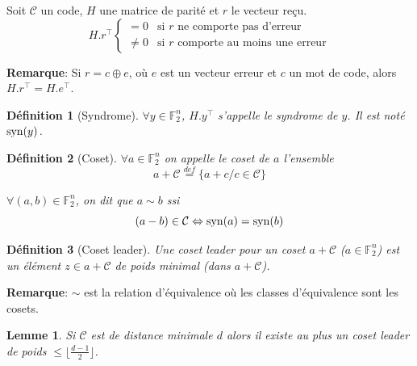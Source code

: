 \documentclass[a4paper,10pt,twocolumn]{article}
\theoremstyle{break}
\newcommand{\code}[1]{\mathcal{#1}}
\newcommand{\C}{\code{C}}
\newcommand{\syn}[1]{\mathop{\rm{syn}}(#1)}
\newcommand{\F}{\mathbb{F}}
\newcommand{\FF}{\F_2}
\newcommand{\FFn}[1]{\FF^{#1}}
\newtheorem{mydef}{Définition}
\newtheorem{mylemma}{Lemme}
\newenvironment{note}[1]
{\textbf{#1}:}
{}
\newenvironment{remarque}
{\begin{note}{Remarque}}
{\end{note}}
\begin{document}
Soit $\mathcal{C}$ un code, $H$ une matrice de parité et $r$ le vecteur reçu.
$$ H.r^\top 
\begin{cases}
 = 0 & \text{si $r$ ne comporte pas d'erreur}\\
 \ne 0 & \text{si $r$ comporte au moins une erreur}
\end{cases}
$$

\begin{remarque}
 Si $r = c \oplus e$, où $e$ est un vecteur erreur et $c$ un mot de code, alors $H.r^\top = H.e^\top$.
\end{remarque}

\begin{mydef}[Syndrome]
$\forall y \in \FFn{n}$, $H.y^\top$ s'appelle le syndrome de $y$. Il est noté $\syn{y}$.
\end{mydef}

\begin{mydef}[Coset]
$\forall a \in \FFn{n}$ on appelle le coset de $a$ l'ensemble 
$$a+\C \stackrel{def}{=} \{ a +c / c \in \C \}$$

$\forall (a,b) \in \FFn{n}$, on dit que $a \sim b$ ssi
$$(a - b) \in \C \Leftrightarrow \syn{a} = \syn{b}$$
\end{mydef}

\begin{mydef}[Coset leader]
 Une coset leader pour un coset $a + \C$ ($a \in \FFn{n}$) est un élément $z \in a + \C$ de poids minimal (dans $a + \C$).
\end{mydef}


\begin{remarque}
 $\sim$ est la relation d'équivalence où les classes d'équivalence sont les cosets.
\end{remarque}

\begin{mylemma}
 Si $\C$ est de distance minimale $d$ alors il existe au plus un coset leader de poids $ \le \lfloor \frac{d-1}{2} \rfloor$.
\end{mylemma}
\end{document}
